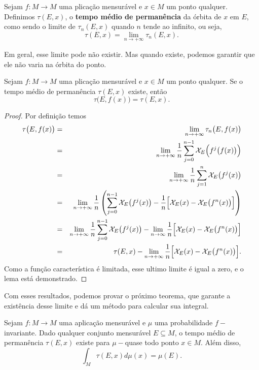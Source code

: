 \begin{definicao} Sejam $f:M\to M$ uma plicação mensurável e $x\in M$ um ponto qualquer. Definimos $\tau(E,x)$, o \textbf{tempo médio de permanência} da órbita de $x$ em $E$, como sendo o limite de $\tau_n(E,x)$ quando $n$ tende ao infinito, ou seja,
\begin{equation*}
\tau(E,x)=\lim_{n\to+\infty}\tau_n(E,x).
\end{equation*}
\end{definicao}

Em geral, esse limite pode não existir. Mas quando existe, podemos garantir que ele não varia na órbita do ponto.

\begin{lema}\label{tmpo} Sejam $f:M\to M$ uma plicação mensurável e $x\in M$ um ponto qualquer. Se o tempo médio de permanência $\tau(E,x)$ existe, então $$\tau\big(E,f(x)\big)=\tau(E,x).$$
\end{lema}

\begin{proof} Por definição temos 
\begin{eqnarray*}
\tau\big(E,f(x)\big) & = & \lim_{n\to+\infty}\tau_n\big(E,f(x)\big)\\
& = & \lim_{n\to+\infty}\dfrac{1}{n}\sum_{j=0}^{n-1}\mathcal{X}_{E}\Big(f^j\big(f(x)\big)\Big)\\
& = & \lim_{n\to+\infty}\dfrac{1}{n}\sum_{j=1}^{n}\mathcal{X}_{E}\big(f^j(x)\big)\\
& = & \lim_{n\to+\infty}\dfrac{1}{n}\left(\sum_{j=0}^{n-1}\mathcal{X}_{E}\big(f^j(x)\big)-\dfrac{1}{n}\Big[\mathcal{X}_{E}(x)-\mathcal{X}_{E}\big(f^n(x)\big)\Big]\right)\\
& = & \lim_{n\to+\infty}\dfrac{1}{n}\sum_{j=0}^{n-1}\mathcal{X}_{E}\big(f^j(x)\big)-\lim_{n\to\infty}\dfrac{1}{n}\Big[\mathcal{X}_{E}(x)-\mathcal{X}_{E}\big(f^n(x)\big)\Big]\\
& = & \tau(E,x)-\lim_{n\to+\infty}\dfrac{1}{n}\Big[\mathcal{X}_{E}(x)-\mathcal{X}_{E}\big(f^n(x)\big)\Big].
\end{eqnarray*}
Como a função característica é limitada, esse ultimo limite é igual a zero, e o lema está demonstrado.
\end{proof}

Com esses resultados, podemos provar o próximo teorema, que garante a existência desse limite e dá um método para calcular sua integral.

\begin{teorema}\label{teb1} Sejam $f:M\to M$ uma aplicação mensurável e $\mu$ uma probabilidade $f-$in\-va\-ri\-an\-te. Dado qualquer conjunto mensurável $E\subseteq M$, o tempo médio de permanência $\tau(E,x)$ existe para $\mu-$quase todo ponto $x\in M$. Além disso, 
\begin{equation}\label{eqteb1}
\int_{M}\tau(E,x)d\mu(x)=\mu(E).
\end{equation}
\end{teorema}


